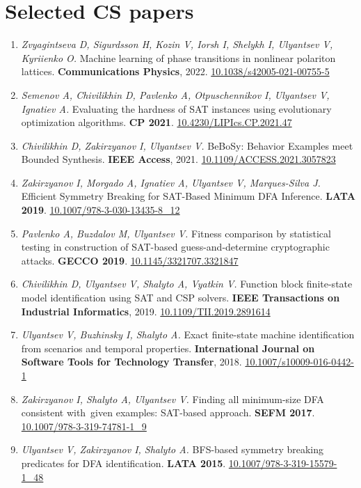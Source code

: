 \documentclass[11pt,a4paper,sans]{moderncv}        %
\newcommand{\doi}[1]{\href{http://doi.org/#1}{#1}}
\begin{document}
\section{Selected CS papers}
\begin{enumerate}
  \item\emph{Zvyagintseva D, Sigurdsson H, Kozin V, Iorsh I, Shelykh I, Ulyantsev V, Kyriienko O.}
       Machine learning of phase transitions in nonlinear polariton lattices.
       \textbf{Communications Physics}, 2022.
       \doi{10.1038/s42005-021-00755-5}
  \item\emph{Semenov A, Chivilikhin D, Pavlenko A, Otpuschennikov I, Ulyantsev V, Ignatiev A.}
       Evaluating the hardness of SAT instances using evolutionary optimization algorithms.
       \textbf{CP 2021}.
       \doi{10.4230/LIPIcs.CP.2021.47}
  \item\emph{Chivilikhin D, Zakirzyanov I, Ulyantsev V.}
       BeBoSy: Behavior Examples meet Bounded Synthesis.
       \textbf{IEEE Access}, 2021.
       \doi{10.1109/ACCESS.2021.3057823}
  \item\emph{Zakirzyanov I, Morgado A, Ignatiev A, Ulyantsev V, Marques-Silva J.}
       Efficient Symmetry Breaking for SAT-Based Minimum DFA Inference.
       \textbf{LATA 2019}.
       \doi{10.1007/978-3-030-13435-8\_12}
  \item\emph{Pavlenko A, Buzdalov M, Ulyantsev V.}
       Fitness comparison by statistical testing in construction of SAT-based guess-and-determine cryptographic attacks.
       \textbf{GECCO 2019}.
       \doi{10.1145/3321707.3321847}
  \item\emph{Chivilikhin D, Ulyantsev V, Shalyto A, Vyatkin V.}
       Function block finite-state model identification using SAT and CSP solvers.
       \textbf{IEEE Transactions on Industrial Informatics}, 2019.
       \doi{10.1109/TII.2019.2891614}
  \item\emph{Ulyantsev V, Buzhinsky I, Shalyto A.}
       Exact finite-state machine identification from scenarios and temporal properties.
       \textbf{International Journal on Software Tools for Technology Transfer}, 2018.
       \doi{10.1007/s10009-016-0442-1}
  \item\emph{Zakirzyanov I, Shalyto A, Ulyantsev V.}
       Finding all minimum-size DFA consistent with given examples: SAT-based approach.
       \textbf{SEFM 2017}.
       \doi{10.1007/978-3-319-74781-1\_9}
  \item\emph{Ulyantsev V, Zakirzyanov I, Shalyto A.}
       BFS-based symmetry breaking predicates for DFA identification.
       \textbf{LATA 2015}.
       \doi{10.1007/978-3-319-15579-1\_48}
\end{enumerate}
\end{document}
